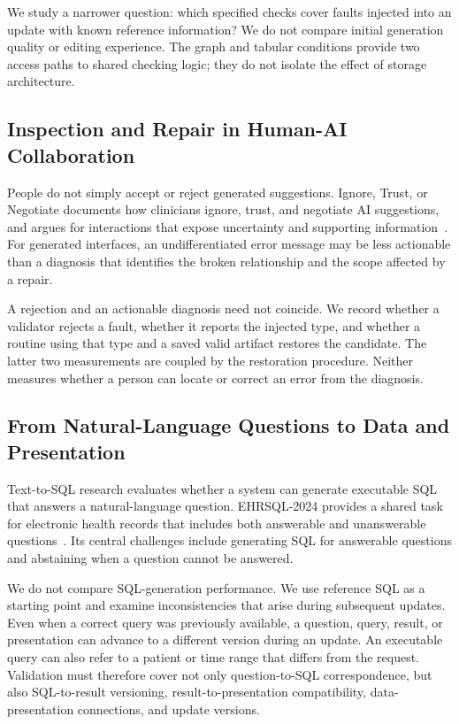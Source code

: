 \documentclass[manuscript,review,anonymous]{acmart}
\begin{document}
We study a narrower question: which specified checks cover faults injected into an update with known reference information? We do not compare initial generation quality or editing experience. The graph and tabular conditions provide two access paths to shared checking logic; they do not isolate the effect of storage architecture.

\subsection{Inspection and Repair in Human-AI Collaboration}

People do not simply accept or reject generated suggestions. Ignore, Trust, or Negotiate documents how clinicians ignore, trust, and negotiate AI suggestions, and argues for interactions that expose uncertainty and supporting information~\cite{sivaraman2023ignore}. For generated interfaces, an undifferentiated error message may be less actionable than a diagnosis that identifies the broken relationship and the scope affected by a repair.

A rejection and an actionable diagnosis need not coincide. We record whether a validator rejects a fault, whether it reports the injected type, and whether a routine using that type and a saved valid artifact restores the candidate. The latter two measurements are coupled by the restoration procedure. Neither measures whether a person can locate or correct an error from the diagnosis.

\subsection{From Natural-Language Questions to Data and Presentation}

Text-to-SQL research evaluates whether a system can generate executable SQL that answers a natural-language question. EHRSQL-2024 provides a shared task for electronic health records that includes both answerable and unanswerable questions~\cite{lee2024ehrsql}. Its central challenges include generating SQL for answerable questions and abstaining when a question cannot be answered.

We do not compare SQL-generation performance. We use reference SQL as a starting point and examine inconsistencies that arise during subsequent updates. Even when a correct query was previously available, a question, query, result, or presentation can advance to a different version during an update. An executable query can also refer to a patient or time range that differs from the request. Validation must therefore cover not only question-to-SQL correspondence, but also SQL-to-result versioning, result-to-presentation compatibility, data-presentation connections, and update versions.
\end{document}
